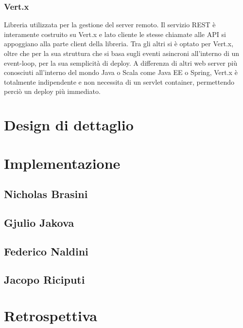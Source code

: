 	 \subsubsection{Vert.x}\label{subsub:tecnologie:vert.x}
	  Libreria utilizzata per la gestione del server remoto. Il servizio REST è interamente costruito su Vert.x e lato cliente le stesse chiamate alle API si appoggiano alla parte client della libreria.
	  Tra gli altri si è optato per Vert.x, oltre che per la sua struttura che si basa sugli eventi asincroni all'interno di un event-loop, per la sua semplicità di deploy. A differenza di altri web server più conosciuti all'interno del mondo Java o Scala come Java EE o Spring, Vert.x è totalmente
	  indipendente e non necessita di un servlet container, permettendo perciò un deploy più immediato.
        \clearpage
        
    \section{Design di dettaglio}\label{sec:design:details}
    
    \clearpage
    
    \section{Implementazione}\label{sec:implementation}
        \subsection{Nicholas Brasini}\label{subsec:brasini}
        \subsection{Gjulio Jakova}\label{subsec:jakova}
        \subsection{Federico Naldini}\label{subsec:naldini}
        \subsection{Jacopo Riciputi}\label{subsec:riciputi}
        
        \clearpage
        
    \section{Retrospettiva}\label{sec:retrospective}


